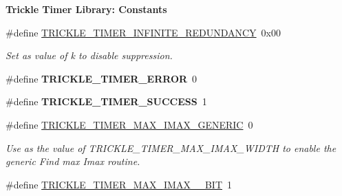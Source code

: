 \begin{Indent}{\bf Trickle Timer Library\+: Constants}\par
\begin{DoxyCompactItemize}
\item 
\hypertarget{group__trickle-timer_ga72117b57dd1e192ca8a016055d2310f3}{}\#define \hyperlink{group__trickle-timer_ga72117b57dd1e192ca8a016055d2310f3}{T\+R\+I\+C\+K\+L\+E\+\_\+\+T\+I\+M\+E\+R\+\_\+\+I\+N\+F\+I\+N\+I\+T\+E\+\_\+\+R\+E\+D\+U\+N\+D\+A\+N\+C\+Y}~0x00\label{group__trickle-timer_ga72117b57dd1e192ca8a016055d2310f3}

\begin{DoxyCompactList}\small\item\em Set as value of k to disable suppression. \end{DoxyCompactList}\item 
\hypertarget{group__trickle-timer_gac24600ceec4a0dc4b57df1baeb4b876d}{}\#define {\bfseries T\+R\+I\+C\+K\+L\+E\+\_\+\+T\+I\+M\+E\+R\+\_\+\+E\+R\+R\+O\+R}~0\label{group__trickle-timer_gac24600ceec4a0dc4b57df1baeb4b876d}

\item 
\hypertarget{group__trickle-timer_ga8075209f39b5756f0eb5c4ec4b8136e2}{}\#define {\bfseries T\+R\+I\+C\+K\+L\+E\+\_\+\+T\+I\+M\+E\+R\+\_\+\+S\+U\+C\+C\+E\+S\+S}~1\label{group__trickle-timer_ga8075209f39b5756f0eb5c4ec4b8136e2}

\item 
\hypertarget{group__trickle-timer_ga63607c0782cac7d825d07bff8c89b3d4}{}\#define \hyperlink{group__trickle-timer_ga63607c0782cac7d825d07bff8c89b3d4}{T\+R\+I\+C\+K\+L\+E\+\_\+\+T\+I\+M\+E\+R\+\_\+\+M\+A\+X\+\_\+\+I\+M\+A\+X\+\_\+\+G\+E\+N\+E\+R\+I\+C}~0\label{group__trickle-timer_ga63607c0782cac7d825d07bff8c89b3d4}

\begin{DoxyCompactList}\small\item\em Use as the value of T\+R\+I\+C\+K\+L\+E\+\_\+\+T\+I\+M\+E\+R\+\_\+\+M\+A\+X\+\_\+\+I\+M\+A\+X\+\_\+\+W\+I\+D\+T\+H to enable the generic \textquotesingle{}Find max Imax\textquotesingle{} routine. \end{DoxyCompactList}\item 
\hypertarget{group__trickle-timer_ga41b658ea4619c5e104efb050f664e3f1}{}\#define \hyperlink{group__trickle-timer_ga41b658ea4619c5e104efb050f664e3f1}{T\+R\+I\+C\+K\+L\+E\+\_\+\+T\+I\+M\+E\+R\+\_\+\+M\+A\+X\+\_\+\+I\+M\+A\+X\+\_\+\_\+\+B\+I\+T}~1\label{group__trickle-timer_ga41b658ea4619c5e104efb050f664e3f1}


\end{DoxyCompactItemize}
\end{Indent}
